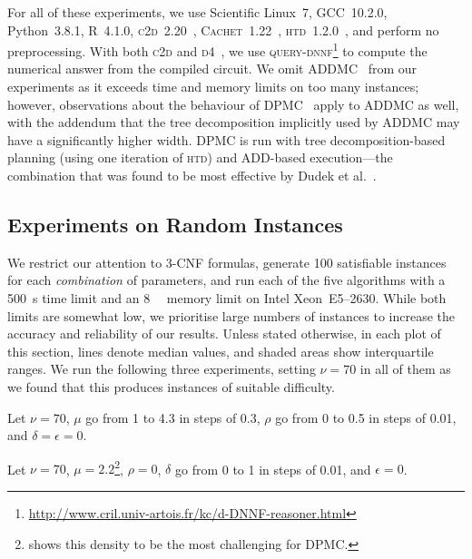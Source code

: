 \documentclass[runningheads]{llncs}
\begin{document}
For all of these experiments, we use Scientific Linux~7, GCC~10.2.0,
Python~3.8.1, R~4.1.0, \textsc{c2d}~2.20~\cite{DBLP:conf/ecai/Darwiche04},
\textsc{Cachet}~1.22~\cite{DBLP:conf/sat/SangBBKP04},
\textsc{htd}~1.2.0~\cite{DBLP:conf/cpaior/AbseherMW17}, and perform no
preprocessing. With both \textsc{c2d} and
\textsc{d4}~\cite{DBLP:conf/ijcai/LagniezM17}, we use
\textsc{query-dnnf}\footnote{\url{http://www.cril.univ-artois.fr/kc/d-DNNF-reasoner.html}}
to compute the numerical answer from the compiled circuit. We omit
\textsc{ADDMC}~\cite{DBLP:conf/aaai/DudekPV20} from our experiments as it
exceeds time and memory limits on too many instances; however, observations
about the behaviour of \textsc{DPMC}~\cite{DBLP:conf/cp/DudekPV20} apply to
\textsc{ADDMC} as well, with the addendum that the tree decomposition implicitly
used by \textsc{ADDMC} may have a significantly higher width. \textsc{DPMC} is
run with tree decomposition-based planning (using one iteration of \textsc{htd})
and ADD-based execution---the combination that was found to be most effective by
Dudek et al.~\cite{DBLP:conf/cp/DudekPV20}.

\subsection{Experiments on Random Instances}\label{sec:random_experiments}

We restrict our attention to 3-CNF formulas, generate 100 satisfiable instances
for each \emph{combination} of parameters, and run each of the five algorithms
with a \SI{500}{\second} time limit and an \SI{8}{\gibi\byte} memory limit on
Intel Xeon~E5--2630. While both limits are somewhat low, we prioritise large
numbers of instances to increase the accuracy and reliability of our results.
Unless stated otherwise, in each plot of this section, lines denote median
values, and shaded areas show interquartile ranges. We run the following three
experiments, setting $\nu = 70$ in all of them as we found that this produces
instances of suitable difficulty.

\begin{experiment}\label{exp:density}
  Let $\nu = 70$, $\mu$ go from 1 to 4.3 in steps of 0.3, $\rho$ go from 0 to
  0.5 in steps of 0.01, and $\delta = \epsilon = 0$.
\end{experiment}

\begin{experiment}[$\delta$]\label{exp:delta}
  Let $\nu = 70$, $\mu = 2.2$\footnote{ shows this density to
    be the most challenging for \textsc{DPMC}.},
  $\rho = 0$, $\delta$ go from 0 to 1 in steps of 0.01, and $\epsilon = 0$.
\end{experiment}
\end{document}
